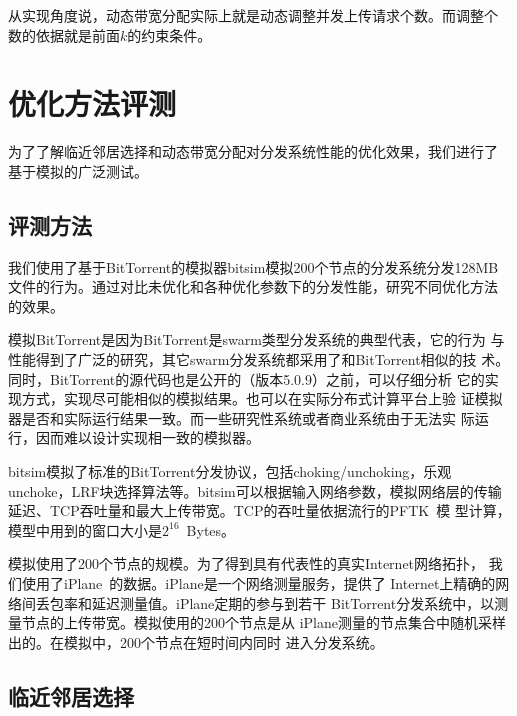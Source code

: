 
从实现角度说，动态带宽分配实际上就是动态调整并发上传请求个数。而调整个
数的依据就是前面$k$的约束条件。

\section{优化方法评测}
\label{sec:bteval}

为了了解临近邻居选择和动态带宽分配对分发系统性能的优化效果，我们进行了
基于模拟的广泛测试。

\subsection{评测方法}

我们使用了基于BitTorrent的模拟器bitsim模拟200个节点的分发系统分发128MB
文件的行为。通过对比未优化和各种优化参数下的分发性能，研究不同优化方法
的效果。

模拟BitTorrent是因为BitTorrent是swarm类型分发系统的典型代表，它的行为
与性能得到了广泛的研究，其它swarm分发系统都采用了和BitTorrent相似的技
术。同时，BitTorrent的源代码也是公开的（版本5.0.9）之前，可以仔细分析
它的实现方式，实现尽可能相似的模拟结果。也可以在实际分布式计算平台上验
证模拟器是否和实际运行结果一致。而一些研究性系统或者商业系统由于无法实
际运行，因而难以设计实现相一致的模拟器。

bitsim模拟了标准的BitTorrent分发协议，包括choking/unchoking，乐观
unchoke，LRF块选择算法等。bitsim可以根据输入网络参数，模拟网络层的传输
延迟、TCP吞吐量和最大上传带宽。TCP的吞吐量依据流行的PFTK~\cite{pftk}模
型计算，模型中用到的窗口大小是$2^{16}$~Bytes。

模拟使用了200个节点的规模。为了得到具有代表性的真实Internet网络拓扑，
我们使用了iPlane~\cite{iplane}的数据。iPlane是一个网络测量服务，提供了
Internet上精确的网络间丢包率和延迟测量值。iPlane定期的参与到若干
BitTorrent分发系统中，以测量节点的上传带宽。模拟使用的200个节点是从
iPlane测量的节点集合中随机采样出的。在模拟中，200个节点在短时间内同时
进入分发系统。



\subsection{临近邻居选择}


